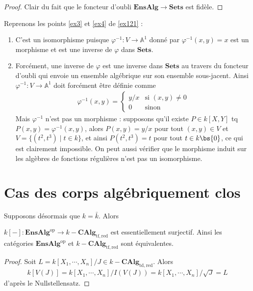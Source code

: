        \begin{proof}
            Clair du fait que le foncteur d'oubli $\mathbf{EnsAlg} \to \mathbf{Sets}$ est fidèle.
        \end{proof}
        \begin{expl}
            Reprenons les points \ref{ex3} et \ref{ex4} de \ref{ex121} :
            \begin{enumerate} \addtocounter{enumi}{2}
                \item C'est un isomorphisme puisque $\varphi^{-1} : V \to \mathbb{A}^1$ donné par $\varphi^{-1}(x,y) = x$ est un morphisme et est une inverse de $\varphi$ dans $\mathbf{Sets}$.
                \item Forcément, une inverse de $\varphi$ est une inverse dans $\mathbf{Sets}$ au travers du foncteur d'oubli qui envoie un ensemble algébrique sur son ensemble sous-jacent. Ainsi $\varphi^{-1} : V \to \mathbb{A}^1$ doit forcément être définie comme
                \begin{align*}
                    \varphi^{-1}(x,y) = 
                    \begin{cases}
                        y/x & \text{si } (x,y) \neq 0 \\
                        0 & \text{sinon}
                    \end{cases}
                \end{align*}
                Mais $\varphi^{-1}$ n'est pas un morphisme : supposons qu'il existe $P \in k[X,Y]$ tq $P(x,y) = \varphi^{-1}(x,y)$, alors $P(x,y) = y/x$ pour tout $(x,y) \in V$ et $V = \{(t^2, t^3) \mid t \in k \}$, et ainsi $P(t^2, t^3) = t$ pour tout $t \in k \bs \{0\}$, ce qui est clairement impossible. On peut aussi vérifier que le morphisme induit sur les algèbres de fonctions régulières n'est pas un isomorphisme.
            \end{enumerate}
        \end{expl}
        
    \section{Cas des corps algébriquement clos}
        Supposons désormais que $k = \bar k$. Alors
        \begin{prop}
            $k[-] : \mathbf{EnsAlg}^\mathrm{op} \to k-\mathbf{CAlg}_\mathrm{tf, red}$ est essentiellement surjectif. Ainsi les catégories $\mathbf{EnsAlg}^\mathrm{op}$ et $k-\mathbf{CAlg}_\mathrm{tf, red}$ sont équivalentes.
        \end{prop}
        \begin{proof}
            Soit $L = k[X_1, \cdots, X_n]/J \in k-\mathbf{CAlg}_\mathrm{td, red}$. Alors
            \begin{align*}
                k[V(J)] = k[X_1, \cdots, X_n]/I(V(J)) = k[X_1, \cdots, X_n]/\sqrt{J} = L
            \end{align*}
            d'après le Nullstellensatz.
        \end{proof}